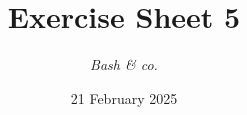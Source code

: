 




\title{{\vspace{-12mm}\huge\textbf{Exercise Sheet 5}}}
\author{\textit{Bash \& co.}}
\date{{\small 21 February 2025}}


    \maketitle
    \bigskip
    
    \bigskip
    
    \bigskip
    
